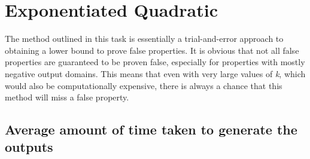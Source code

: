 \documentclass[11pt]{article}
\begin{document}
\section{Exponentiated Quadratic}
\label{sec:Task 1}
The method outlined in this task is essentially a trial-and-error approach to obtaining a lower bound to prove false properties. It is obvious that not all false properties are guaranteed to be proven false, especially for properties with mostly negative output domains. This means that even with very large values of \emph{k}, which would also be computationally expensive, there is always a chance that this method will miss a false property.
\subsection{Average amount of time taken to generate the outputs}
\label{sec:131}
 
\end{document}
